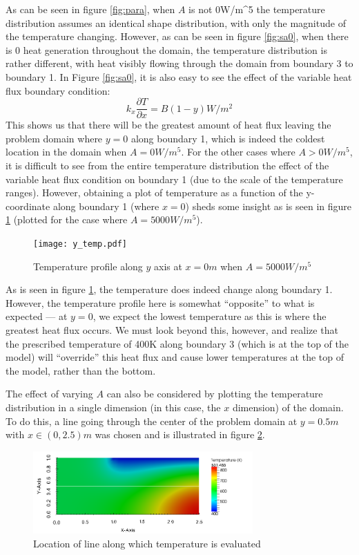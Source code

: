 \documentclass[letterpaper,10pt]{article}
\begin{document}
As can be seen in figure \ref{fig:para}, when $A$ is not \unit{0}{W/m^5} the temperature distribution assumes an identical shape distribution, with only the magnitude of the temperature changing. However, as can be seen in figure \ref{fig:sa0}, when there is 0 heat generation throughout the domain, the temperature distribution is rather different, with heat visibly flowing through the domain from boundary 3 to boundary 1. In Figure \ref{fig:sa0}, it is also easy to see the effect of the variable heat flux boundary condition:
\[k_x\frac{\partial T}{\partial x} = B \left(1-y\right) \unit{}{W/m^2}\]
\noindent This shows us that there will be the greatest amount of heat flux leaving the problem domain where $y=0$ along boundary 1, which is indeed the coldest location in the domain when $A=\unit{0}{W/m^5}$. For the other cases where $A > \unit{0}{W/m^5}$, it is difficult to see from the entire temperature distribution the effect of the variable heat flux condition on boundary 1 (due to the scale of the temperature ranges). However, obtaining a plot of temperature as a function of the y-coordinate along boundary 1 (where $x=0$) sheds some insight as is seen in figure \ref{fig:y_temp} (plotted for the case where $A=\unit{5000}{W/m^5}$).

\begin{figure}[H]
	\centering
	\texttt{[image: y\_temp.pdf]}
	\caption{Temperature profile along $y$ axis at $x=\unit{0}{m}$ when $A=\unit{5000}{W/m^5}$}
	\label{fig:y_temp}
\end{figure}

As is seen in figure \ref{fig:y_temp}, the temperature does indeed change along boundary 1. However, the temperature profile here is somewhat ``opposite'' to what is expected --- at $y=0$, we expect the lowest temperature as this is where the greatest heat flux occurs. We must look beyond this, however, and realize that the prescribed temperature of \unit{400}{K} along boundary 3 (which is at the top of the model) will ``override'' this heat flux and cause lower temperatures at the top of the model, rather than the bottom.

The effect of varying $A$ can also be considered by plotting the temperature distribution in a single dimension (in this case, the $x$ dimension) of the domain. To do this, a line going through the center of the problem domain at $y=\unit{0.5}{m}$ with $x\in\unit{(0, 2.5)}{m}$ was chosen and is illustrated in figure \ref{fig:studyline}.

\begin{figure}[H]
	\centering
	\includegraphics[width=0.75\textwidth]{studyline.png}
	\caption{Location of line along which temperature is evaluated}
	\label{fig:studyline}
\end{figure}
\end{document}
